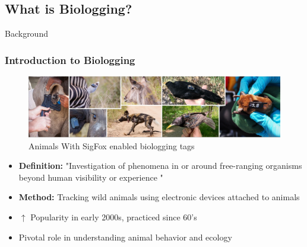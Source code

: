 \documentclass{beamer}
\begin{document}
\subsection{What is Biologging?}
\begin{frame}{Background}
  \frametitle{Introduction to Biologging}
        \begin{figure}[htbp]
          \centering
          \includegraphics[width=.75\textwidth, height=.2\textheight]{TrakingDevices.png}
          \caption{Animals With SigFox enabled biologging tags \cite{wild2023multi}}
          \label{fig:TaggedAnimals}
        \end{figure}
        \begin{itemize}
          \item \textbf{Definition:} "Investigation of phenomena in or around free-ranging organisms beyond human visibility or experience \cite{boyd2004bio}"
          \item \textbf{Method:} Tracking wild animals using electronic devices attached to animals
          \item $\uparrow$ Popularity in early 2000s, practiced since 60's
          \item Pivotal role in understanding animal behavior and ecology
        \end{itemize}
\end{frame}
\end{document}
